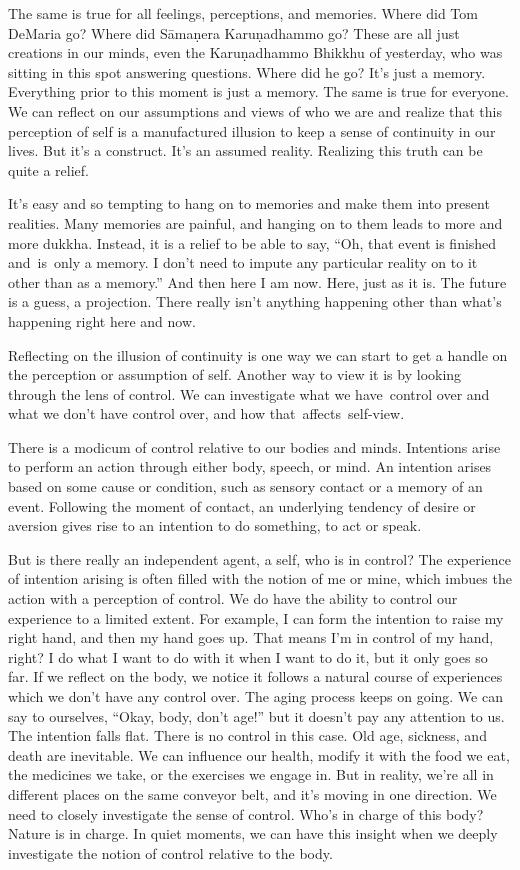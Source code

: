 The same is true for all feelings, perceptions, and memories. Where did Tom DeMaria go? Where did Sāmaṇera Karuṇadhammo go? These are all just creations in our minds, even the Karuṇadhammo Bhikkhu of yesterday, who was sitting in this spot answering questions. Where did he go? It's just a memory. Everything prior to this moment is just a memory. The same is true for everyone. We can reflect on our assumptions and views of who we are and realize that this perception of self is a manufactured illusion to keep a sense of continuity in our lives. But it's a construct. It's an assumed reality. Realizing this truth can be quite a relief.

It's easy and so tempting to hang on to memories and make them into present realities. Many memories are painful, and hanging on to them leads to more and more dukkha. Instead, it is a relief to be able to say, ``Oh, that event is finished \mbox{and is only} a memory. I don't need to impute any particular reality on to it other than as a memory.'' And then here I am now. Here, just as it is. The future is a guess, a projection. There really isn't anything happening other than what's happening right here and now.

Reflecting on the illusion of continuity is one way we can start to get a handle on the perception or assumption of self. Another way to view it is by looking through the lens of control. We can investigate what we \mbox{have control} over and what we don't have control over, and how \mbox{that affects self-view.}

There is a modicum of control relative to our bodies and minds. Intentions arise to perform an action through either body, speech, or mind. An intention arises based on some cause or condition, such as sensory contact or a memory of an event. Following the moment of contact, an underlying tendency of desire or aversion gives rise to an intention to do something, to act or speak.

But is there really an independent agent, a self, who is in control? The experience of intention arising is often filled with the notion of me or mine, which imbues the action with a perception of control. We do have the ability to control our experience to a limited extent. For example, I can form the intention to raise my right hand, and then my hand goes up. That means I'm in control of my hand, right? I do what I want to do with it when I want to do it, but it only goes so far. If we reflect on the body, we notice it follows a natural course of experiences which we don't have any control over. The aging process keeps on going. We can say to ourselves, ``Okay, body, don't age!'' but it doesn't pay any attention to us. The intention falls flat. There is no control in this case. Old age, sickness, and death are inevitable. We can influence our health, modify it with the food we eat, the medicines we take, or the exercises we engage in. But in reality, we're all in different places on the same conveyor belt, and it's moving in one direction. We need to closely investigate the sense of control. Who's in charge of this body? Nature is in charge. In quiet moments, we can have this insight when we deeply investigate the notion of control relative to the body.


